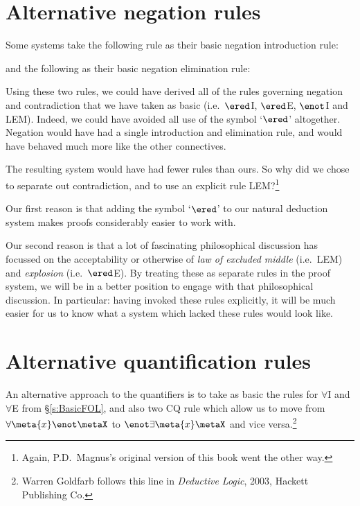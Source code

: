 \section{Alternative negation rules}
Some systems take the following rule as their basic negation introduction rule:
\begin{fitchproof}
	\open
	\close
	\have[\ ]{}{\enot\metaX}
\end{fitchproof}
and the following as their basic negation elimination rule:
\begin{fitchproof}
	\open
	\close
\end{fitchproof}
Using these two rules, we could have derived all of the rules governing negation and contradiction that we have taken as basic (i.e.\ $\ered$I, $\ered$E, $\enot$I and LEM). Indeed, we could have avoided all use of the symbol `$\ered$' altogether. Negation would have had a single introduction and elimination rule, and would have behaved much more like the other connectives.

The resulting system would have had fewer rules than ours. So why did we chose to separate out contradiction, and to use an explicit rule LEM?\footnote{Again, P.D.\ Magnus's original version of this book went the other way.}

Our first reason is that adding the symbol `$\ered$' to our natural deduction system makes proofs considerably easier to work with.

Our second reason is that a lot of fascinating philosophical discussion has focussed on the acceptability or otherwise of \emph{law of excluded middle} (i.e.\ LEM) and \emph{explosion} (i.e.\ $\ered$E). By treating these as separate rules in the proof system, we will be  in a better position to engage with that philosophical discussion. In particular: having invoked these rules explicitly, it will be much easier for us to know what a system which lacked these rules would look like.



\section{Alternative quantification rules}
An alternative approach to the quantifiers is to take as basic the rules for $\forall$I and $\forall$E from \S\ref{s:BasicFOL}, and also two CQ rule which allow us to move from $\forall \meta{x} \enot \metaX$ to $\enot \exists \meta{x} \metaX$ and vice versa.\footnote{Warren Goldfarb follows this line in \emph{Deductive Logic}, 2003, Hackett Publishing Co.}  

